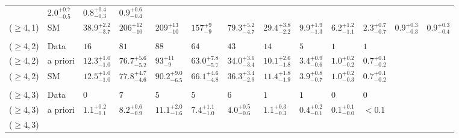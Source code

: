 \begin{table}[!t]
{\begin{tabular}{ lllllllllllll }
             & $2.0^{+0.7}_{-0.5}$
             & $0.8^{+0.4}_{-0.3}$
             & $0.9^{+0.6}_{-0.4}$                      \\
    ($\geq$4,\,1)
             & SM
             & $38.9^{+2.2}_{-3.7}$
             & $206^{+12}_{-10}$
             & $209^{+13}_{-10}$
             & $157^{+9}_{-9}$
             & $79.3^{+5.2}_{-4.7}$
             & $29.4^{+3.8}_{-2.2}$
             & $9.9^{+1.9}_{-1.3}$
             & $6.2^{+1.2}_{-1.1}$
             & $2.3^{+0.7}_{-0.7}$
             & $0.9^{+0.3}_{-0.3}$
             & $0.9^{+0.3}_{-0.4}$                      \\\\[-2ex]
    ($\geq$4,\,2)
             & Data
             & $16$
             & $81$
             & $88$
             & $64$
             & $43$
             & $14$
             & $5$
             & $1$
             & $1$                                      \\
    ($\geq$4,\,2)
             & a priori
             & $12.3^{+1.0}_{-1.0}$
             & $76.7^{+5.6}_{-5.2}$
             & $93^{+11}_{-9}$
             & $63.0^{+7.8}_{-5.7}$
             & $34.0^{+3.6}_{-3.4}$
             & $10.1^{+2.6}_{-1.8}$
             & $3.4^{+0.9}_{-0.6}$
             & $1.0^{+0.2}_{-0.2}$
             & $0.7^{+0.1}_{-0.2}$                      \\
    ($\geq$4,\,2)
             & SM
             & $12.5^{+1.0}_{-1.0}$
             & $77.8^{+4.7}_{-4.6}$
             & $90.2^{+9.0}_{-6.5}$
             & $66.1^{+4.6}_{-4.8}$
             & $36.3^{+3.4}_{-2.9}$
             & $11.4^{+1.8}_{-1.9}$
             & $3.9^{+0.8}_{-0.7}$
             & $1.0^{+0.2}_{-0.3}$
             & $0.7^{+0.1}_{-0.2}$                      \\\\[-2ex]
    ($\geq$4,\,3)
             & Data
             & $0$
             & $7$
             & $5$
             & $5$
             & $6$
             & $1$
             & $1$
             & $0$
             & $0$                                      \\
    ($\geq$4,\,3)
             & a priori
             & $1.1^{+0.2}_{-0.1}$
             & $8.2^{+0.6}_{-0.9}$
             & $11.1^{+2.0}_{-1.6}$
             & $7.4^{+1.1}_{-1.0}$
             & $4.0^{+0.5}_{-0.6}$
             & $1.1^{+0.3}_{-0.3}$
             & $0.4^{+0.2}_{-0.1}$
             & $0.1^{+0.1}_{-0.0}$
             & $<$0.1                                   \\
    ($\geq$4,\,3)

\end{tabular}}
\end{table}

